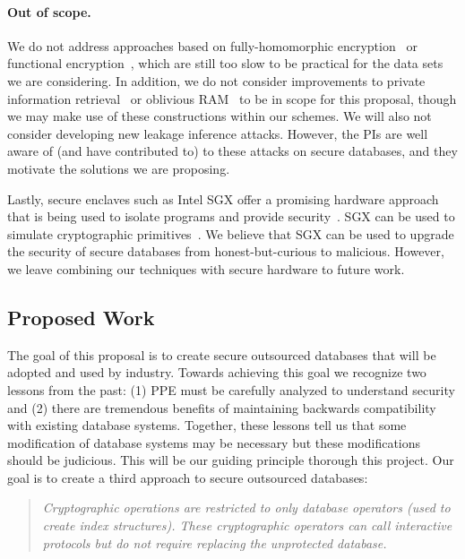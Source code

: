 \paragraph{Out of scope.} We do not address approaches based on
fully-homomorphic encryption~\cite{STOC:Gentry09} or functional
encryption~\cite{FOCS:GGHRSW13}, which are still too slow to be
practical for the data sets we are considering.
In addition, we do not
consider improvements to private information
retrieval~\cite{FOCS:CGKS95} or oblivious
RAM~\cite{STOC:Goldreich87,goldreich1996software} to be in scope for
this proposal, though we may make use of these constructions within our
schemes.
We will also not consider developing new leakage inference attacks.
However, the PIs are well aware of (and have contributed to) to these attacks on
secure databases, and they motivate the solutions we are
proposing.

Lastly, secure enclaves such as Intel SGX offer a promising hardware approach that is being used to isolate programs and provide security~\cite{EPRINT:CosDev16}.  SGX can be used to simulate cryptographic primitives~\cite{EPRINT:SasGorFle17,EPRINT:FVBG16}.  We believe that SGX can be used to upgrade the security of secure databases from honest-but-curious to malicious.  However, we leave combining our techniques with secure hardware to future work.


\subsection{Proposed Work}
The goal of this proposal is to create secure outsourced databases that
will be adopted and used by industry.  Towards achieving this goal we
recognize two lessons from the past: (1) PPE must be carefully analyzed
to understand security and (2) there are tremendous benefits of
maintaining backwards compatibility with existing database systems.
Together, these lessons tell us that some modification of database
systems may be necessary but these modifications should be judicious.
This will be our guiding principle thorough this project.  Our goal is to create a third approach to secure outsourced databases: 
\begin{quote}\emph{Cryptographic operations are restricted to only
database operators (used to create index structures).  These
cryptographic operators can call interactive protocols but do not
require replacing the unprotected database. }
\end{quote}

